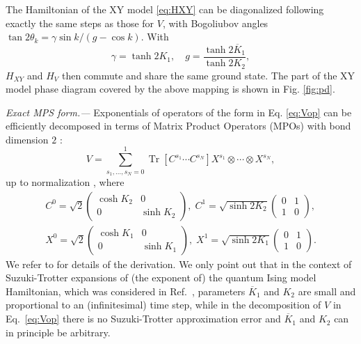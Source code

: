 \documentclass[prl,twocolumn,showpacs,floatfix,superscriptaddress,nofootinbib]{revtex4-1}
\DeclareMathOperator{\Tr}{Tr}
\newcommand{\br}[1]{\left(#1\right)}
\newcommand{\Br}[1]{\left[#1\right]}
\begin{document}
The Hamiltonian of the XY model \eqref{eq:HXY} can be diagonalized following exactly the same steps as those for $V$, with Bogoliubov angles 
$\tan 2 \theta_k  = \gamma \sin k / \br {g - \cos k}$.
With
\begin{equation} \label{eq:XYmap}
   \gamma = \tanh 2 K_1, \quad g = \frac{\tanh 2 \overline K_1}{ \tanh 2 K_2},
\end{equation}
$H_{XY}$ and $H_V$ then commute and share the same ground state. 
The part of the XY model phase diagram covered by the above mapping is shown in Fig. \ref{fig:pd}.


{\it Exact MPS form.---}
Exponentials of operators of the form in Eq. \eqref{eq:Vop} can be efficiently decomposed in terms of Matrix Product Operators (MPOs) with bond dimension $2$ \cite{Murg2010}:
\begin{equation} \label{eq:VMPO}
V =  \sum_{s_1,\dotsc, s_N=0}^1   \Tr \Br{C^{s_1} \dotsm C^{s_N}} X^{s_1}  \otimes \dotsm \otimes X^{s_N},
\end{equation}
up to normalization \cite{normalization_comment}, where
\begin{equation*}
\begin{split}
      C^0 = \sqrt2 \begin{pmatrix} \cosh K_2 & 0  \\ 0&   \sinh K_2 \end{pmatrix}, \;
      C^1 = \sqrt{\sinh 2 K_2} \begin{pmatrix} 0 & 1  \\ 1 & 0 \end{pmatrix}, \\
      X^0 = \sqrt2 \begin{pmatrix} \cosh K_1 & 0  \\ 0&   \sinh K_1 \end{pmatrix}, \;
      X^1 = \sqrt{\sinh 2 K_1} \begin{pmatrix} 0 & 1  \\ 1 & 0 \end{pmatrix}.
\end{split}
\end{equation*}
We refer to \cite{Murg2010} for details of the derivation. 
We only point out that in the context of Suzuki-Trotter expansions of (the exponent of) the quantum Ising model Hamiltonian, which was considered in Ref.~, parameters $\overline K_1$ and $K_2$ are small and proportional to an (infinitesimal) time step, while in the decomposition of $V$ in Eq.~\eqref{eq:Vop} there is no Suzuki-Trotter approximation error and $\overline K_1$ and $ K_2$ can in principle be arbitrary.
\end{document}
